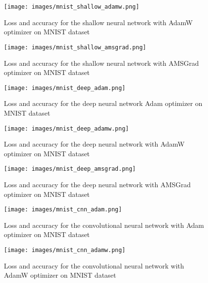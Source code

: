 \documentclass{article} %
\begin{document}
\begin{figure}[h]
\begin{center}
\texttt{[image: images/mnist\_shallow\_adamw.png]}
\end{center}
\caption{Loss and accuracy for the shallow neural network with AdamW optimizer on MNIST dataset}
\end{figure}

\begin{figure}[h]
\begin{center}
\texttt{[image: images/mnist\_shallow\_amsgrad.png]}
\end{center}
\caption{Loss and accuracy for the shallow neural network with AMSGrad optimizer on MNIST dataset}
\end{figure}

\begin{figure}[h]
\begin{center}
\texttt{[image: images/mnist\_deep\_adam.png]}
\end{center}
\caption{Loss and accuracy for the deep neural network Adam optimizer on MNIST dataset}
\end{figure}

\begin{figure}[h]
\begin{center}
\texttt{[image: images/mnist\_deep\_adamw.png]}
\end{center}
\caption{Loss and accuracy for the deep neural network with AdamW optimizer on MNIST dataset}
\end{figure}

\begin{figure}[h]
\begin{center}
\texttt{[image: images/mnist\_deep\_amsgrad.png]}
\end{center}
\caption{Loss and accuracy for the deep neural network with AMSGrad optimizer on MNIST dataset}
\end{figure}

\begin{figure}[h]
\begin{center}
\texttt{[image: images/mnist\_cnn\_adam.png]}
\end{center}
\caption{Loss and accuracy for the convolutional neural network with Adam optimizer on MNIST dataset}
\end{figure}

\begin{figure}[h]
\begin{center}
\texttt{[image: images/mnist\_cnn\_adamw.png]}
\end{center}
\caption{Loss and accuracy for the convolutional neural network with AdamW optimizer on MNIST dataset}
\end{figure}
\end{document}
